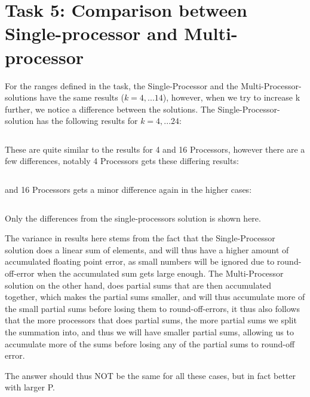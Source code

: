 \section{Task 5: Comparison between Single-processor and Multi-processor}

For the ranges defined in the task, the Single-Processor and the Multi-Processor-solutions
have the same results ($k = 4, ... 14$), however, when we try to increase k further, we
notice a difference between the solutions. The Single-Processor-solution has the following results
for $k = 4, ... 24$:
\inputminted{matlab}{singleout}

These are quite similar to the results for 4 and 16 Processors, however there are a few differences,
notably 4 Processors gets these differing results:

\inputminted{matlab}{4proc}

and 16 Processors gets a minor difference again in the higher cases:

\inputminted{matlab}{16proc}

Only the differences from the single-processors solution is shown here.

The variance in results here stems from the fact that the Single-Processor solution does a linear sum
of elements, and will thus have a higher amount of accumulated floating point error, as small numbers
will be ignored due to round-off-error when the accumulated sum gets large enough. The Multi-Processor
solution on the other hand, does partial sums that are then accumulated together, which makes the partial
sums smaller, and will thus accumulate more of the small partial sums before losing them to round-off-errors,
it thus also follows that the more processors that does partial sums, the more partial sums we split the
summation into, and thus we will have smaller partial sums, allowing us to accumulate more of the sums before
losing any of the partial sums to round-off error.

The answer should thus NOT be the same for all these cases, but in fact better with larger P.

